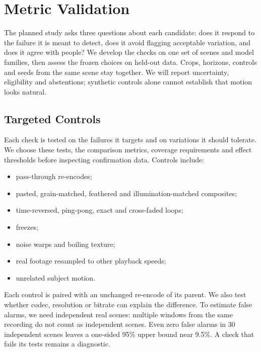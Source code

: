\section{Metric Validation}
\label{sec:validation}
The planned study asks three questions about each candidate: does it respond to the failure it is meant to detect, does it avoid flagging acceptable variation, and does it agree with people? We develop the checks on one set of scenes and model families, then assess the frozen choices on held-out data. Crops, horizons, controls and seeds from the same scene stay together. We will report uncertainty, eligibility and abstentions; synthetic controls alone cannot establish that motion looks natural.

\subsection{Targeted Controls}
Each check is tested on the failures it targets and on variations it should tolerate. We choose these tests, the comparison metrics, coverage requirements and effect thresholds before inspecting confirmation data. Controls include:
\begin{itemize}
\item pass-through re-encodes;
\item pasted, grain-matched, feathered and illumination-matched composites;
\item time-reversed, ping-pong, exact and cross-faded loops;
\item freezes;
\item noise warps and boiling texture;
\item real footage resampled to other playback speeds;
\item unrelated subject motion.
\end{itemize}
Each control is paired with an unchanged re-encode of its parent. We also test whether codec, resolution or bitrate can explain the difference. To estimate false alarms, we need independent real scenes: multiple windows from the same recording do not count as independent scenes. Even zero false alarms in 30 independent scenes leaves a one-sided 95\% upper bound near 9.5\%. A check that fails its tests remains a diagnostic.

